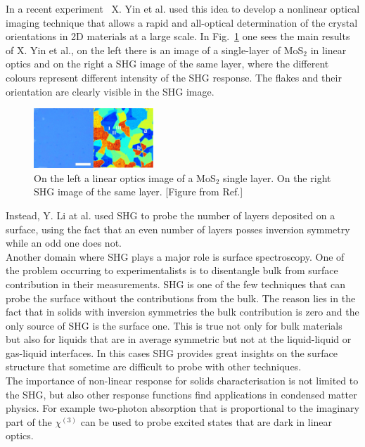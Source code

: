 In a recent experiment~\cite{yin2014edge}  X. Yin et al. used this idea to develop a nonlinear optical imaging technique that allows a rapid and all-optical determination of the crystal orientations in 2D materials at a large scale. In Fig.~\ref{mos2} one sees the main results of  X. Yin et al., on the left there is an image of a single-layer of MoS$_2$ in linear optics and on the right a SHG image of the same layer, where the different colours represent different intensity of the SHG response. The flakes and their orientation are clearly visible in the SHG image.
\begin{figure}
    \vspace{-0.7cm}
  \begin{center}
    \includegraphics[width=0.4\textwidth]{Figures/mos2}
  \end{center}
  \caption{On the left a linear optics image of a  MoS$_2$ single layer. On the right SHG image of the same layer. \label{mos2} [Figure from Ref.\cite{yin2014edge}]}
\end{figure}
Instead, Y. Li at al. used SHG to probe the number of layers deposited on a surface, using the fact that an even number of layers posses inversion symmetry while an odd one does not.\cite{doi:10.1021/nl401561r}\\
Another domain where SHG plays a major role is surface spectroscopy. One of the problem occurring to experimentalists is to disentangle bulk from surface contribution in their measurements. SHG is one of the few techniques that can probe the surface without the contributions from the bulk. The reason lies in the fact that in solids with inversion symmetries the bulk contribution is zero and the only source of SHG is the surface one. This is true not only for bulk materials but also for liquids that are in average symmetric but not at the liquid-liquid or gas-liquid interfaces. In  this cases SHG provides  great insights on the surface structure that sometime are difficult to probe with other techniques.\cite{eisenthal1996liquid} \\ 
The importance of non-linear response for solids characterisation is not limited to the SHG, but also other response functions find applications in condensed matter physics. For example two-photon absorption that is proportional to the imaginary part of the $\chi^{(3)}$ can be used to probe excited states that are dark in linear optics.\cite{wang2005optical,cassabois2015hexagonal}\\ 
